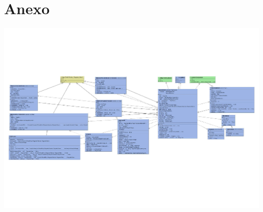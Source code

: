 \chapter{Anexo}
\thispagestyle{empty}
{%
	\label{fig:anexo_diagrama_main_activity}
	\centering
	\includegraphics[angle=90]{imagenes/main_activity_class_diagram.pdf}
	\par
}
\restoregeometry